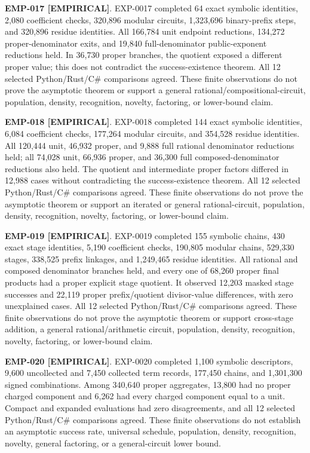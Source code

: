 \documentclass[11pt]{article}
\newcommand{\claimstatus}[2]{\textbf{#1 [#2]}}
\begin{document}
\claimstatus{EMP-017}{EMPIRICAL}. EXP-0017 completed 64 exact symbolic
identities, 2,080 coefficient checks, 320,896 modular circuits, 1,323,696
binary-prefix steps, and 320,896 residue identities. All 166,784 unit
endpoint reductions, 134,272 proper-denominator exits, and 19,840
full-denominator public-exponent reductions held. In 36,730 proper branches,
the quotient exposed a different proper value; this does not contradict the
success-existence theorem. All 12 selected Python/Rust/C\# comparisons
agreed. These finite observations do not prove the asymptotic theorem or
support a general rational/compositional-circuit, population, density,
recognition, novelty, factoring, or lower-bound claim.

\claimstatus{EMP-018}{EMPIRICAL}. EXP-0018 completed 144 exact symbolic
identities, 6,084 coefficient checks, 177,264 modular circuits, and 354,528
residue identities. All 120,444 unit, 46,932 proper, and 9,888 full rational
denominator reductions held; all 74,028 unit, 66,936 proper, and 36,300 full
composed-denominator reductions also held. The quotient and intermediate
proper factors differed in 12,988 cases without contradicting the
success-existence theorem. All 12 selected Python/Rust/C\# comparisons
agreed. These finite observations do not prove the asymptotic theorem or
support an iterated or general rational-circuit, population, density,
recognition, novelty, factoring, or lower-bound claim.

\claimstatus{EMP-019}{EMPIRICAL}. EXP-0019 completed 155 symbolic chains,
430 exact stage identities, 5,190 coefficient checks, 190,805 modular chains,
529,330 stages, 338,525 prefix linkages, and 1,249,465 residue identities.
All rational and composed denominator branches held, and every one of 68,260
proper final products had a proper explicit stage quotient. It observed
12,203 masked stage successes and 22,119 proper prefix/quotient divisor-value
differences, with zero unexplained cases. All 12 selected Python/Rust/C\#
comparisons agreed. These finite observations do not prove the asymptotic
theorem or support cross-stage addition, a general rational/arithmetic
circuit, population, density, recognition, novelty, factoring, or lower-bound
claim.

\claimstatus{EMP-020}{EMPIRICAL}. EXP-0020 completed 1,100 symbolic
descriptors, 9,600 uncollected and 7,450 collected term records, 177,450
chains, and 1,301,300 signed combinations. Among 340,640 proper aggregates,
13,800 had no proper charged component and 6,262 had every charged component
equal to a unit. Compact and expanded evaluations had zero disagreements,
and all 12 selected Python/Rust/C\# comparisons agreed. These finite
observations do not establish an asymptotic success rate, universal schedule,
population, density, recognition, novelty, general factoring, or a
general-circuit lower bound.
\end{document}
